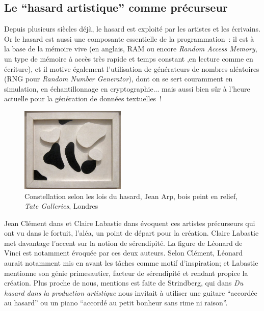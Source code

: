 \documentclass{article}
\begin{document}
		\subsection{Le ``hasard artistique'' comme précurseur}
			Depuis plusieurs siècles déjà, le hasard est exploité par les artistes et les écrivains. Or le hasard est aussi une composante essentielle de la programmation : il est à la base de la mémoire vive (en anglais, RAM ou encore \textit{Random Access Memory}, un type de mémoire à accès très rapide et temps constant ,en lecture comme en écriture), et il motive également l'utilisation de générateurs de nombres aléatoires (RNG pour \textit{Random Number Generator}), dont on se sert couramment en simulation, en échantillonnage en cryptographie... mais aussi bien sûr à l'heure actuelle pour la génération de données textuelles !\\
			
			\begin{figure}
				\centering
				\includegraphics[width=5cm]{arp_hasard.jpg}
				\caption{Constellation selon les lois du hasard, Jean Arp, bois peint en relief, \textit{Tate Galleries}, Londres}
			\end{figure}
			
			Jean Clément dans \cite{clement2011} et Claire Labastie dans \cite{labastie2016} évoquent ces artistes précurseurs qui ont vu dans le fortuit, l'aléa, un point de départ pour la création. Claire Labastie met davantage l'accent sur la notion de sérendipité. La figure de Léonard de Vinci est notamment évoquée par ces deux auteurs. Selon Clément, Léonard aurait notamment mis en avant les tâches comme motif d'inspiration; et Labastie mentionne son génie primesautier, facteur de sérendipité et rendant propice la création. Plus proche de nous, mentions est faite de Strindberg, qui dans \textit{Du hasard dans la production artistique} \cite{strindberg1990} nous invitait à utiliser une guitare ``accordée au hasard'' ou un piano ``accordé au petit bonheur sans rime ni raison''.\\
					
\end{document}
